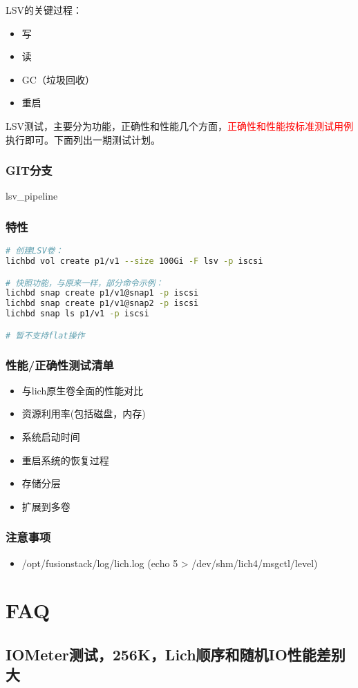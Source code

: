 \documentclass[UTF8]{ctexart}
\begin{document}
LSV的关键过程：
\begin{tcolorbox}
    \begin{itemize}
        \item 写
        \item 读
        \item GC（垃圾回收）
        \item 重启
    \end{itemize}
\end{tcolorbox}

LSV测试，主要分为功能，正确性和性能几个方面，\textcolor{red}{正确性和性能按标准测试用例}执行即可。下面列出一期测试计划。

\subsubsection{GIT分支}

lsv\_pipeline

\subsubsection{特性}

\begin{lstlisting}[language=bash,frame=single]
# 创建LSV卷：
lichbd vol create p1/v1 --size 100Gi -F lsv -p iscsi

# 快照功能，与原来一样，部分命令示例：
lichbd snap create p1/v1@snap1 -p iscsi
lichbd snap create p1/v1@snap2 -p iscsi
lichbd snap ls p1/v1 -p iscsi

# 暂不支持flat操作

\end{lstlisting}

\subsubsection{性能/正确性测试清单}

\begin{itemize}
    \item 与lich原生卷全面的性能对比
    \item 资源利用率(包括磁盘，内存)
    \item 系统启动时间
    \item 重启系统的恢复过程
    \item 存储分层
    \item 扩展到多卷
\end{itemize}

\subsubsection{注意事项}

\begin{itemize}
    \item /opt/fusionstack/log/lich.log (echo 5 > /dev/shm/lich4/msgctl/level)
\end{itemize}


\section{FAQ}

\subsection{IOMeter测试，256K，Lich顺序和随机IO性能差别大}
\end{document}
